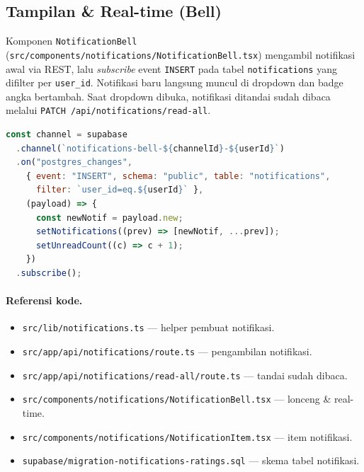 \subsection{Tampilan \& Real-time (Bell)}
Komponen \texttt{NotificationBell}
(\texttt{src/components/notifications/NotificationBell.tsx}) mengambil
notifikasi awal via REST, lalu \emph{subscribe} event \texttt{INSERT} pada tabel
\texttt{notifications} yang difilter per \texttt{user\_id}. Notifikasi baru
langsung muncul di dropdown dan badge angka bertambah. Saat dropdown dibuka,
notifikasi ditandai sudah dibaca melalui
\texttt{PATCH /api/notifications/read-all}.

\begin{lstlisting}[language=JavaScript,caption={Subscribe notifikasi real-time (NotificationBell.tsx)}]
const channel = supabase
  .channel(`notifications-bell-${channelId}-${userId}`)
  .on("postgres_changes",
    { event: "INSERT", schema: "public", table: "notifications",
      filter: `user_id=eq.${userId}` },
    (payload) => {
      const newNotif = payload.new;
      setNotifications((prev) => [newNotif, ...prev]);
      setUnreadCount((c) => c + 1);
    })
  .subscribe();
\end{lstlisting}

\paragraph{Referensi kode.}
\begin{itemize}
  \item \texttt{src/lib/notifications.ts} --- helper pembuat notifikasi.
  \item \texttt{src/app/api/notifications/route.ts} --- pengambilan notifikasi.
  \item \texttt{src/app/api/notifications/read-all/route.ts} --- tandai sudah dibaca.
  \item \texttt{src/components/notifications/NotificationBell.tsx} --- lonceng \& real-time.
  \item \texttt{src/components/notifications/NotificationItem.tsx} --- item notifikasi.
  \item \texttt{supabase/migration-notifications-ratings.sql} --- skema tabel notifikasi.
\end{itemize}

